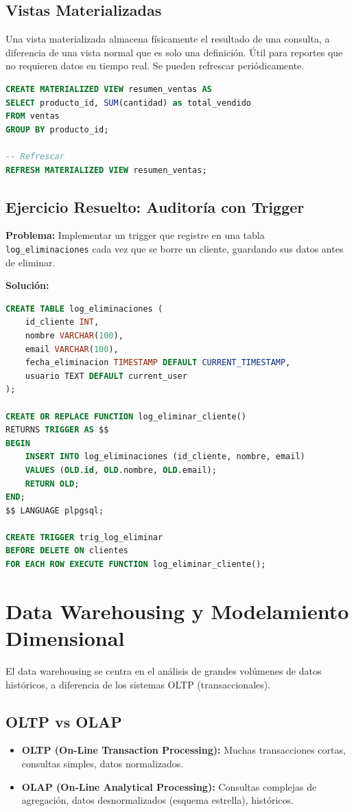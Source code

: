 \documentclass[12pt,a4paper,openany,oneside]{book}
\begin{document}
\section{Vistas Materializadas}
Una vista materializada almacena físicamente el resultado de una consulta, a diferencia de una vista normal que es solo una definición. Útil para reportes que no requieren datos en tiempo real. Se pueden refrescar periódicamente.

\begin{lstlisting}[language=SQL]
CREATE MATERIALIZED VIEW resumen_ventas AS
SELECT producto_id, SUM(cantidad) as total_vendido
FROM ventas
GROUP BY producto_id;

-- Refrescar
REFRESH MATERIALIZED VIEW resumen_ventas;
\end{lstlisting}

\section{Ejercicio Resuelto: Auditoría con Trigger}
\textbf{Problema:} Implementar un trigger que registre en una tabla \texttt{log_eliminaciones} cada vez que se borre un cliente, guardando sus datos antes de eliminar.

\textbf{Solución:}
\begin{lstlisting}[language=SQL]
CREATE TABLE log_eliminaciones (
    id_cliente INT,
    nombre VARCHAR(100),
    email VARCHAR(100),
    fecha_eliminacion TIMESTAMP DEFAULT CURRENT_TIMESTAMP,
    usuario TEXT DEFAULT current_user
);

CREATE OR REPLACE FUNCTION log_eliminar_cliente()
RETURNS TRIGGER AS $$
BEGIN
    INSERT INTO log_eliminaciones (id_cliente, nombre, email)
    VALUES (OLD.id, OLD.nombre, OLD.email);
    RETURN OLD;
END;
$$ LANGUAGE plpgsql;

CREATE TRIGGER trig_log_eliminar
BEFORE DELETE ON clientes
FOR EACH ROW EXECUTE FUNCTION log_eliminar_cliente();
\end{lstlisting}

\chapter{Data Warehousing y Modelamiento Dimensional}
El data warehousing se centra en el análisis de grandes volúmenes de datos históricos, a diferencia de los sistemas OLTP (transaccionales).

\section{OLTP vs OLAP}
\begin{itemize}
    \item \textbf{OLTP (On-Line Transaction Processing):} Muchas transacciones cortas, consultas simples, datos normalizados.
    \item \textbf{OLAP (On-Line Analytical Processing):} Consultas complejas de agregación, datos desnormalizados (esquema estrella), históricos.
\end{itemize}
\end{document}
